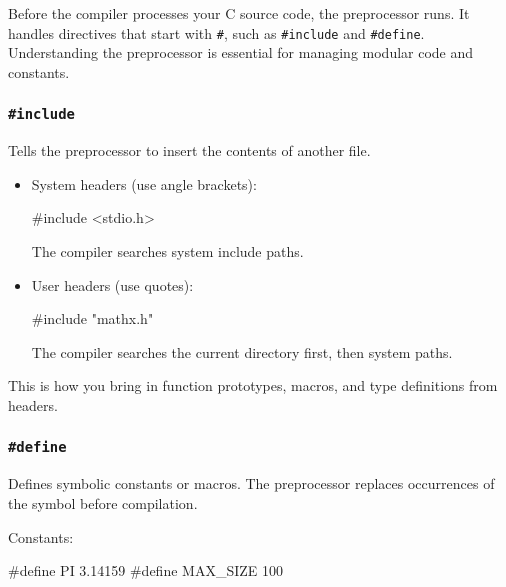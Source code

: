 \documentclass[
  letterpaper,
  DIV=11,
  numbers=noendperiod]{scrreprt}
\newenvironment{Shaded}{\begin{snugshade}}{\end{snugshade}}
\newcommand{\DecValTok}[1]{\textcolor[rgb]{0.68,0.00,0.00}{#1}}
\newcommand{\FloatTok}[1]{\textcolor[rgb]{0.68,0.00,0.00}{#1}}
\newcommand{\ImportTok}[1]{\textcolor[rgb]{0.00,0.46,0.62}{#1}}
\newcommand{\PreprocessorTok}[1]{\textcolor[rgb]{0.68,0.00,0.00}{#1}}
\begin{document}
Before the compiler processes your C source code, the preprocessor runs.
It handles directives that start with \texttt{\#}, such as
\texttt{\#include} and \texttt{\#define}. Understanding the preprocessor
is essential for managing modular code and constants.

\subsubsection{\texorpdfstring{\texttt{\#include}}{\#include}}\label{include}

Tells the preprocessor to insert the contents of another file.

\begin{itemize}
\item
  System headers (use angle brackets):

\begin{Shaded}
\begin{Highlighting}[]
\PreprocessorTok{\#include }\ImportTok{\textless{}stdio.h\textgreater{}}
\end{Highlighting}
\end{Shaded}

  The compiler searches system include paths.
\item
  User headers (use quotes):

\begin{Shaded}
\begin{Highlighting}[]
\PreprocessorTok{\#include }\ImportTok{"mathx.h"}
\end{Highlighting}
\end{Shaded}

  The compiler searches the current directory first, then system paths.
\end{itemize}

This is how you bring in function prototypes, macros, and type
definitions from headers.

\subsubsection{\texorpdfstring{\texttt{\#define}}{\#define}}\label{define}

Defines symbolic constants or macros. The preprocessor replaces
occurrences of the symbol before compilation.

Constants:

\begin{Shaded}
\begin{Highlighting}[]
\PreprocessorTok{\#define PI }\FloatTok{3.14159}
\PreprocessorTok{\#define MAX\_SIZE }\DecValTok{100}
\end{Highlighting}
\end{Shaded}
\end{document}
